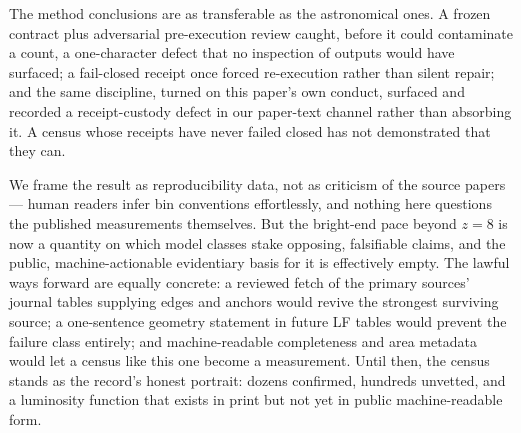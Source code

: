 \documentclass[twocolumn]{aastex702}
\begin{document}
The method conclusions are as transferable as the astronomical ones. A frozen contract
plus adversarial pre-execution review caught, before it could contaminate a count, a
one-character defect that no inspection of outputs would have surfaced; a fail-closed
receipt once forced re-execution rather than silent repair; and the same discipline,
turned on this paper's own conduct, surfaced and recorded a receipt-custody defect in
our paper-text channel rather than absorbing it. A census whose receipts have never
failed closed has not demonstrated that they can.

We frame the result as reproducibility data, not as criticism of the source papers ---
human readers infer bin conventions effortlessly, and nothing here questions the
published measurements themselves. But the bright-end pace beyond $z=8$ is now a
quantity on which model classes stake opposing, falsifiable claims, and the public,
machine-actionable evidentiary basis for it is effectively empty. The lawful ways
forward are equally concrete: a reviewed fetch of the primary sources' journal tables
supplying edges and anchors would revive the strongest surviving source; a one-sentence
geometry statement in future LF tables would prevent the failure class entirely; and
machine-readable completeness and area metadata would let a census like this one become
a measurement. Until then, the census stands as the record's honest portrait: dozens
confirmed, hundreds unvetted, and a luminosity function that exists in print but not
yet in public machine-readable form.
\end{document}
